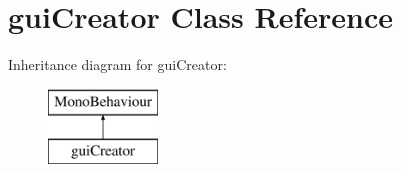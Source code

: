 \hypertarget{classgui_creator}{}\section{gui\+Creator Class Reference}
\label{classgui_creator}
Inheritance diagram for gui\+Creator\+:\begin{figure}[H]
\begin{center}
\leavevmode
\includegraphics[height=2.000000cm]{classgui_creator}
\end{center}
\end{figure}
